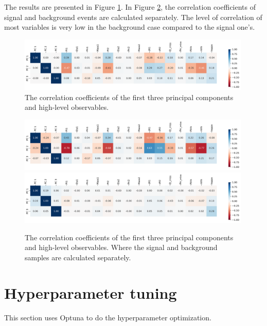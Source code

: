 \documentclass[12pt]{article}
\begin{document}
		The results are presented in Figure \ref{fig:correlation_coefficients_pca}. In Figure \ref{fig:correlation_coefficients_pca-signal-background}, the correlation coefficients of signal and background events are calculated separately. The level of correlation of most variables is very low in the background case compared to the signal one's.
		\begin{figure}[htpb]
			\centering
			\includegraphics[width=0.99\textwidth]{correlation_coefficients_pca.png}
			\caption{The correlation coefficients of the first three principal components and high-level observables.}
			\label{fig:correlation_coefficients_pca}
		\end{figure}
		\begin{figure}[htpb]
			\centering
			\includegraphics[width=0.99\textwidth]{correlation_coefficients_pca-signal.png}
			\includegraphics[width=0.99\textwidth]{correlation_coefficients_pca-background.png}
			\caption{The correlation coefficients of the first three principal components and high-level observables. Where the signal and background samples are calculated separately.}
			\label{fig:correlation_coefficients_pca-signal-background}
		\end{figure}

\section{Hyperparameter tuning}%
\label{sec:hyperparameter_tuning}
	This section uses Optuna to do the hyperparameter optimization.
\end{document}
